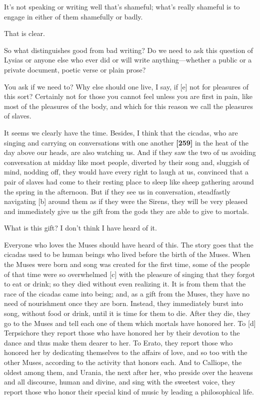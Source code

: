 \saysocrates It's not speaking or writing well that's shameful; what's
really shameful is to engage in either of them shamefully or badly.

\sayphaedrus That is clear.

\saysocrates So what distinguishes good from bad writing? Do we need to ask
this question of Lysias or anyone else who ever did or will write
anything---whether a public or a private document, poetic verse or plain
prose?

\sayphaedrus You ask if we need to? Why else should one live, I say, if
{[}e{]} not for pleasures of this sort? Certainly not for those you
cannot feel unless you are first in pain, like most of the pleasures of
the body, and which for this reason we call the pleasures of slaves.

\saysocrates It seems we clearly have the time. Besides, I think that the
cicadas, who are singing and carrying on conversations with one another
{\bf {[}259{]}} in the heat of the day above our heads, are also
watching us. And if they saw the two of us avoiding conversation at
midday like most people, diverted by their song and, sluggish of mind,
nodding off, they would have every right to laugh at us, convinced that
a pair of slaves had come to their resting place to sleep like sheep
gathering around the spring in the afternoon. But if they see us in
conversation, steadfastly navigating {[}b{]} around them as if they were
the Sirens, they will be very pleased and immediately give us the gift
from the gods they are able to give to mortals.

\sayphaedrus What is this gift? I don't think I have heard of it.

\saysocrates Everyone who loves the Muses should have heard of this. The
story goes that the cicadas used to be human beings who lived before the
birth of the Muses. When the Muses were born and song was created for
the first time, some of the people of that time were so overwhelmed
{[}c{]} with the pleasure of singing that they forgot to eat or drink;
so they died without even realizing it. It is from them that the race of
the cicadas came into being; and, as a gift from the Muses, they have no
need of nourishment once they are born. Instead, they immediately burst
into song, without food or drink, until it is time for them to die.
After they die, they go to the Muses and tell each one of them which
mortals have honored her. To {[}d{]} Terpsichore they report those who
have honored her by their devotion to the dance and thus make them
dearer to her. To Erato, they report those who honored her by dedicating
themselves to the affairs of love, and so too with the other Muses,
according to the activity that honors each. And to Calliope, the oldest
among them, and Urania, the next after her, who preside over the heavens
and all discourse, human and divine, and sing with the sweetest voice,
they report those who honor their special kind of music by leading a
philosophical life.

